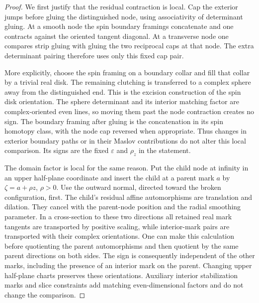 \begin{proof}
We first justify that the residual contraction is local.  Cap the
exterior jumps before gluing the distinguished node, using
associativity of determinant gluing.  At a smooth node the spin
boundary framings concatenate and one contracts against the oriented
tangent diagonal.  At a transverse node one compares strip gluing
with gluing the two reciprocal caps at that node.  The extra
determinant pairing therefore uses only this fixed cap pair.

More explicitly, choose the spin framing on a boundary collar and
fill that collar by a trivial real disk.  The remaining clutching is
transferred to a complex sphere away from the distinguished end.
This is the excision construction of the spin disk orientation.
The sphere determinant and its interior matching factor are
complex-oriented even lines, so moving them past the node
contraction creates no sign.  The boundary framing after gluing is
the concatenation in its spin homotopy class, with the node cap
reversed when appropriate.  Thus changes in exterior boundary
paths or in their Maslov contributions do not alter this local
comparison.  Its signs are the fixed $\varepsilon$ and $\rho_z$
in the statement.

The domain factor is local for the same reason.  Put the child node
at infinity in an upper half-plane coordinate and insert the child
at a parent mark $a$ by $\zeta=a+\rho z$, $\rho>0$.
Use the outward normal, directed toward the broken configuration,
first.  The child's residual affine automorphisms are translation
and dilation.  They cancel with the parent-node position and the
radial smoothing parameter.  In a cross-section to these two
directions all retained real mark tangents are transported by
positive scaling, while interior-mark pairs are transported with
their complex orientations.  One can make this calculation before
quotienting the parent automorphisms and then quotient by the same
parent directions on both sides.  The sign is consequently
independent of the other marks, including the presence of an
interior mark on the parent.  Changing upper half-plane charts
preserves these orientations.  Auxiliary interior stabilization
marks and slice constraints add matching even-dimensional factors
and do not change the comparison.


\end{proof}
